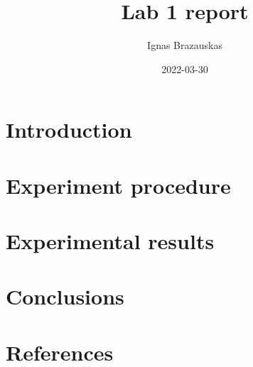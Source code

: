 \documentclass{article}
\begin{document}
\author{Ignas Brazauskas}
\title{Lab 1 report}
\date{2022-03-30}
\maketitle
\newpage

\tableofcontents{}
\newpage

\section{Introduction}

\newpage

\section{Experiment procedure}
\newpage

\section{Experimental results}
%

\newpage

\section{Conclusions}

\newpage

\section{References}
\end{document}

